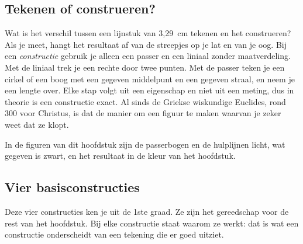\subsection{Tekenen of construeren?}

Wat is het verschil tussen een lijnstuk van 3,29~cm tekenen en het construeren? Als je meet, hangt het resultaat af van de streepjes op je lat en van je oog. Bij een \emph{constructie} gebruik je alleen een passer en een liniaal zonder maatverdeling. Met de liniaal trek je een rechte door twee punten. Met de passer teken je een cirkel of een boog met een gegeven middelpunt en een gegeven straal, en neem je een lengte over. Elke stap volgt uit een eigenschap en niet uit een meting, dus in theorie is een constructie exact. Al sinds de Griekse wiskundige Euclides, rond 300 voor Christus, is dat de manier om een figuur te maken waarvan je zeker weet dat ze klopt.

In de figuren van dit hoofdstuk zijn de passerbogen en de hulplijnen licht, wat gegeven is zwart, en het resultaat in de kleur van het hoofdstuk.

\subsection{Vier basisconstructies}

Deze vier constructies ken je uit de 1ste graad. Ze zijn het gereedschap voor de rest van het hoofdstuk. Bij elke constructie staat waarom ze werkt: dat is wat een constructie onderscheidt van een tekening die er goed uitziet.


